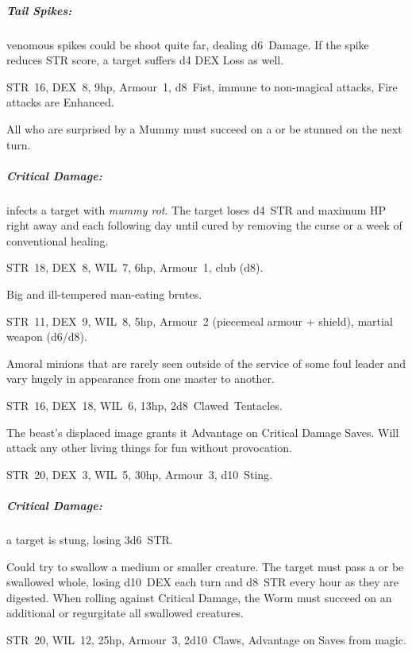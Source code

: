 \documentclass[itdr]{subfiles}
\begin{document}
\subparagraph{Tail Spikes:} venomous spikes could be shoot quite far, dealing d6~Damage. If the spike reduces STR score, a target suffers d4 DEX Loss as well.

\vfill

STR~16, DEX~8, 9hp, Armour~1, d8~Fist, immune to non-magical attacks, Fire attacks are Enhanced.

All who are surprised by a Mummy must succeed on a  or be stunned on the next turn.

\subparagraph{Critical Damage:} infects a target with {\em mummy rot}. The target loses d4~STR and maximum HP right away and each following day until cured by removing the curse or a week of conventional healing.

\vfill

STR~18, DEX~8, WIL~7, 6hp, Armour~1, club (d8).

Big and ill-tempered man-eating brutes.

\vfill

STR~11, DEX~9, WIL~8, 5hp, Armour~2 (piecemeal armour + shield), martial weapon (d6/d8).

Amoral minions that are rarely seen outside of the service of some foul leader and vary hugely in appearance from one master to another.

\vfill

STR~16, DEX~18, WIL~6, 13hp, 2d8~Clawed~Tentacles.

The beast's displaced image grants it Advantage on Critical Damage Saves. Will attack any other living things for fun without provocation.

\vfill
\break

\vfill
{}

STR~20, DEX~3, WIL~5, 30hp, Armour~3, d10~Sting.

\subparagraph{Critical Damage:} a target is stung, losing 3d6~STR.

Could try to swallow a medium or smaller creature. The target must pass a  or be swallowed whole, losing d10~DEX each turn and d8~STR every hour as they are digested. When rolling against Critical Damage, the Worm must succeed on an additional  or regurgitate all swallowed creatures.

\vfill

STR~20, WIL~12, 25hp, Armour~3, 2d10~Claws, Advantage on Saves from magic.
\end{document}
